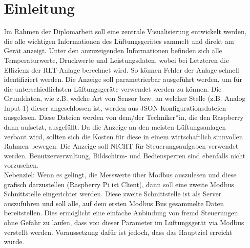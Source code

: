 \chapter{Einleitung} 
\label{aufgabenstellung}
\noindent Im Rahmen der Diplomarbeit soll eine zentrale Visualisierung entwickelt werden, die alle 
wichtigen Informationen des Lüftungsgerätes sammelt und direkt am Gerät anzeigt. Unter 
den anzuzeigenden Informationen befinden sich alle Temperaturwerte, Druckwerte und 
Leistungsdaten, wobei bei Letzteren die Effizienz der RLT-Anlage berechnet wird. So können 
Fehler der Anlage schnell identifiziert werden.
Die Anzeige soll parametrierbar ausgeführt werden, um für die unterschiedlichsten 
Lüftungsgeräte verwendet werden zu können. Die Grunddaten, wie z.B. welche Art von 
Sensor bzw. an welcher Stelle (z.B. Analog Input 1) dieser angeschlossen ist, werden aus JSON Konfigurationsdateien ausgelesen. Diese Dateien werden von dem/der Techniker*in, die den 
Raspberry dann aufsetzt, ausgefüllt.
Da die Anzeige an den meisten Lüftungsanlagen verbaut wird, sollten sich die Kosten für 
diese in einem wirtschaftlich sinnvollen Rahmen bewegen.
Die Anzeige soll NICHT für Steuerungsaufgaben verwendet werden. Benutzerverwaltung, 
Bildschirm- und Bediensperren sind ebenfalls nicht vorzusehen. \\

Nebenziel:
Wenn es gelingt, die Messwerte über Modbus auszulesen und diese grafisch darzustellen (Raspberry Pi ist 
Client), dann soll eine zweite Modbus Schnittstelle eingerichtet werden. Diese zweite 
Schnittstelle ist als Server auszuführen und soll alle, auf dem ersten Modbus Bus
gesammelte Daten bereitstellen. Dies ermöglicht eine einfache Anbindung von fremd 
Steuerungen ohne Gefahr zu laufen, dass von dieser Parameter im Lüftungsgerät via 
Modbus verstellt werden. Voraussetzung dafür ist jedoch, dass das Hauptziel erreicht wurde.

